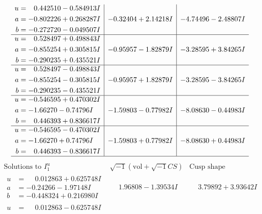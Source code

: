 \documentclass[1p]{elsarticle_modified}
\theoremstyle{definition}
\newcommand{\I}{\sqrt{-1}}
\begin{document}
$$\begin{array}{c|c|c}
\begin{aligned}
u &= \phantom{-}0.442510 - 0.584913 I \\
a &= -0.802226 + 0.268287 I \\
b &= -0.272720 - 0.049507 I\end{aligned}
 & -0.32404 + 2.14218 I & -4.74496 - 2.48807 I \\ \hline\begin{aligned}
u &= \phantom{-}0.528497 + 0.498843 I \\
a &= -0.855254 + 0.305815 I \\
b &= -0.290235 + 0.435521 I\end{aligned}
 & -0.95957 - 1.82879 I & -3.28595 + 3.84265 I \\ \hline\begin{aligned}
u &= \phantom{-}0.528497 - 0.498843 I \\
a &= -0.855254 - 0.305815 I \\
b &= -0.290235 - 0.435521 I\end{aligned}
 & -0.95957 + 1.82879 I & -3.28595 - 3.84265 I \\ \hline\begin{aligned}
u &= -0.546595 + 0.470302 I \\
a &= -1.66270 - 0.74796 I \\
b &= \phantom{-}0.446393 + 0.836617 I\end{aligned}
 & -1.59803 - 0.77982 I & -8.08630 - 0.44983 I \\ \hline\begin{aligned}
u &= -0.546595 - 0.470302 I \\
a &= -1.66270 + 0.74796 I \\
b &= \phantom{-}0.446393 - 0.836617 I\end{aligned}
 & -1.59803 + 0.77982 I & -8.08630 + 0.44983 I\\
 \hline 
 \end{array}$$\newpage$$\begin{array}{c|c|c}  
\text{Solutions to }I^u_{1}& \I (\text{vol} + \sqrt{-1}CS) & \text{Cusp shape}\\
 \hline 
\begin{aligned}
u &= \phantom{-}0.012863 + 0.625748 I \\
a &= -0.24266 - 1.97148 I \\
b &= -0.448324 + 0.216980 I\end{aligned}
 & \phantom{-}1.96808 - 1.39534 I & \phantom{-}3.79892 + 3.93642 I \\ \hline\begin{aligned}
u &= \phantom{-}0.012863 - 0.625748 I \\

\end{aligned}
\end{array}$$
\end{document}
